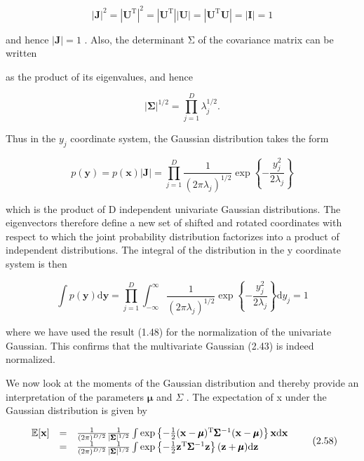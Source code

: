 \documentclass[
  10
]{article}
\begin{document}
\[
\left| \mathbf {J} \right| ^ {2} = \left| \mathbf {U} ^ {\mathrm{T}} \right| ^ {2} = \left| \mathbf {U} ^ {\mathrm{T}} \right| \left| \mathbf {U} \right| = \left| \mathbf {U} ^ {\mathrm{T}} \mathbf {U} \right| = \left| \mathbf {I} \right| = 1\tag{2.54}
\]

and hence \(| \mathbf { J } | = 1\) . Also, the determinant Σ of the
covariance matrix can be written

as the product of its eigenvalues, and hence

\[
| \boldsymbol {\Sigma} | ^ {1 / 2} = \prod_ {j = 1} ^ {D} \lambda_ {j} ^ {1 / 2}.\tag{2.55}
\]

Thus in the \(y _ { j }\) coordinate system, the Gaussian distribution
takes the form

\[
p (\mathbf {y}) = p (\mathbf {x}) | \mathbf {J} | = \prod_ {j = 1} ^ {D} \frac {1}{(2 \pi \lambda_ {j}) ^ {1 / 2}} \exp \left\{- \frac {y _ {j} ^ {2}}{2 \lambda_ {j}} \right\}\tag{2.56}
\]

which is the product of D independent univariate Gaussian distributions.
The eigenvectors therefore define a new set of shifted and rotated
coordinates with respect to which the joint probability distribution
factorizes into a product of independent distributions. The integral of
the distribution in the y coordinate system is then

\[
\int p (\mathbf {y}) \mathrm{d} \mathbf {y} = \prod_ {j = 1} ^ {D} \int_ {- \infty} ^ {\infty} \frac {1}{(2 \pi \lambda_ {j}) ^ {1 / 2}} \exp \left\{- \frac {y _ {j} ^ {2}}{2 \lambda_ {j}} \right\} \mathrm{d} y _ {j} = 1\tag{2.57}
\]

where we have used the result (1.48) for the normalization of the
univariate Gaussian. This confirms that the multivariate Gaussian (2.43)
is indeed normalized.

We now look at the moments of the Gaussian distribution and thereby
provide an interpretation of the parameters \(\pmb { \mu }\) and
\(\Sigma\) . The expectation of x under the Gaussian distribution is
given by

\[
\begin{array}{r c l} \mathbb {E} [ \mathbf {x} ] & = & \frac {1}{(2 \pi) ^ {D / 2}} \frac {1}{| \pmb {\Sigma} | ^ {1 / 2}} \int \exp \left\{- \frac {1}{2} (\mathbf {x} - \pmb {\mu}) ^ {\mathrm{T}} \pmb {\Sigma} ^ {- 1} (\mathbf {x} - \pmb {\mu}) \right\} \mathbf {x} \mathrm{d} \mathbf {x} \\ & = & \frac {1}{(2 \pi) ^ {D / 2}} \frac {1}{| \pmb {\Sigma} | ^ {1 / 2}} \int \exp \left\{- \frac {1}{2} \mathbf {z} ^ {\mathrm{T}} \pmb {\Sigma} ^ {- 1} \mathbf {z} \right\} (\mathbf {z} + \pmb {\mu}) \mathrm{d} \mathbf {z} \end{array}\tag{2.58}
\]
\end{document}
